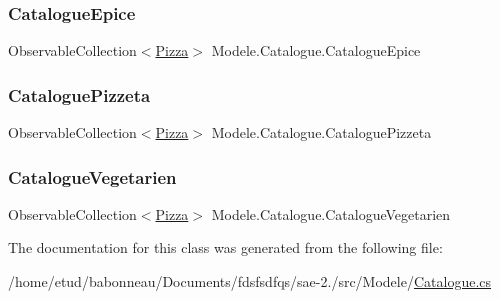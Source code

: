 \mbox{\label{classModele_1_1Catalogue_a633610212f42551a5755212e21bedbca}} 
\subsubsection{\texorpdfstring{Catalogue\+Epice}{CatalogueEpice}}
{\footnotesize\ttfamily Observable\+Collection$<$\hyperlink{classModele_1_1Pizza}{Pizza}$>$ Modele.\+Catalogue.\+Catalogue\+Epice\hspace{0.3cm}{\ttfamily [get]}}

\mbox{\label{classModele_1_1Catalogue_ac5490e1026b5b08d43e30b68da893423}} 
\subsubsection{\texorpdfstring{Catalogue\+Pizzeta}{CataloguePizzeta}}
{\footnotesize\ttfamily Observable\+Collection$<$\hyperlink{classModele_1_1Pizza}{Pizza}$>$ Modele.\+Catalogue.\+Catalogue\+Pizzeta\hspace{0.3cm}{\ttfamily [get]}}

\mbox{\label{classModele_1_1Catalogue_abd7d6d70ddd6ba264c1c91a5b084d9ba}} 
\subsubsection{\texorpdfstring{Catalogue\+Vegetarien}{CatalogueVegetarien}}
{\footnotesize\ttfamily Observable\+Collection$<$\hyperlink{classModele_1_1Pizza}{Pizza}$>$ Modele.\+Catalogue.\+Catalogue\+Vegetarien\hspace{0.3cm}{\ttfamily [get]}}



The documentation for this class was generated from the following file\+:\begin{DoxyCompactItemize}
\item 
/home/etud/babonneau/\+Documents/fdsfsdfqs/sae-\/2./src/\+Modele/\hyperlink{Catalogue_8cs}{Catalogue.\+cs}\end{DoxyCompactItemize}
